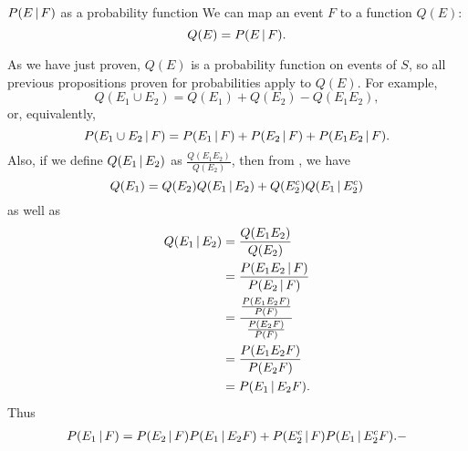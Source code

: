 \begin{bdef}{$P(E \,\vert\, F)$ as a probability function}\label{conditionalprobabilityfunction}
    We can map an event $F$ to a function $Q(E)$: \[
        Q(E) = P(E \,\vert\, F).  
    \]
\end{bdef}
As we have just proven, $Q(E)$ is a probability function on events of $S$, so all previous propositions proven for probabilities apply to $Q(E)$. For example, \[
    Q(E_1 \cup E_2) = Q(E_1) + Q(E_2) - Q(E_1E_2),    
\] or, equivalently, \[
    P(E_1 \cup E_2 \,\vert\, F) = P(E_1 \,\vert\, F) + P(E_2 \,\vert\, F) + P(E_1E_2 \,\vert\, F).    
\] Also, if we define $Q(E_1 \,\vert\, E_2)$ as $\frac{Q(E_1E_2)}{Q(E_2)}$, then from , we have \[
    Q(E_1) = Q(E_2)Q(E_1 \,\vert\, E_2) + Q(E_2^c)Q(E_1 \,\vert\, E_2^c)
\] as well as \[
    \begin{aligned}
        Q(E_1 \,\vert\, E_2) &= \frac{Q(E_1E_2)}{Q(E_2)} \\
        &= \frac{P(E_1E_2 \,\vert\, F)}{P(E_2 \,\vert\, F)} \\
        &= \frac{\frac{P(E_1E_2F)}{P(F)}}{\frac{P(E_2F)}{P(F)}} \\
        &= \frac{P(E_1E_2F)}{P(E_2F)} \\
        &= P(E_1 \,\vert\, E_2F).
    \end{aligned}    
\] Thus \[
    \begin{aligned}
        P(E_1 \,\vert\, F) = P(E_2 \,\vert\, F)P(E_1 \,\vert\, E_2F) + P(E_2^c \,\vert\, F)P(E_1 \,\vert\, E_2^cF).-
    \end{aligned}    
\]
